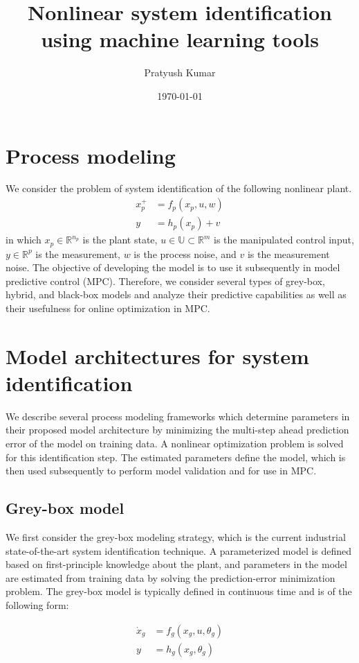 \documentclass[10pt]{article}
\title{Nonlinear system identification using machine learning tools}
\author{Pratyush Kumar}
\date{\today}
\newcommand{\bbR}{\mathbb{R}} \newcommand{\bbW}{\mathbb{W}}
\newcommand{\bbU}{\mathbb{U}} \newcommand{\bbI}{\mathbb{I}}
\begin{document}
\maketitle

\section{Process modeling}
We consider the problem of system identification of the following nonlinear plant.
\begin{align*}
  x_p^+ &= f_p(x_p, u, w) \\
  y &= h_p(x_p) + v
\end{align*}
in which $x_p \in \bbR^{n_p}$ is the plant state, $u \in \bbU \subset \bbR^m$ is the
manipulated control input, $y \in \bbR^p$ is the measurement, $w$ is the process
noise, and $v$ is the measurement noise. The objective of developing the model is to use it subsequently in model predictive control (MPC). Therefore, we consider several types of grey-box, hybrid, and black-box models and analyze their predictive capabilities as well as their usefulness for online optimization in MPC. 

\section{Model architectures for system identification}
We describe several process modeling frameworks which determine parameters in their proposed model architecture by minimizing the multi-step ahead prediction error of the model on training data. A nonlinear optimization problem is solved for this identification step. The estimated parameters define the model, which is then used subsequently to perform model validation and for use in MPC.

\subsection{Grey-box model}
We first consider the grey-box modeling strategy, which is the current industrial state-of-the-art system identification technique. A parameterized model is defined based on first-principle knowledge about the plant, and parameters in the model are estimated from training data by solving the prediction-error minimization problem. The grey-box model is typically defined in continuous time and is of the following form:

\begin{align*}
  \dot{x}_g &= f_g(x_g, u, \theta_g) \\
  y &= h_g(x_g, \theta_g)
\end{align*}
\end{document}
